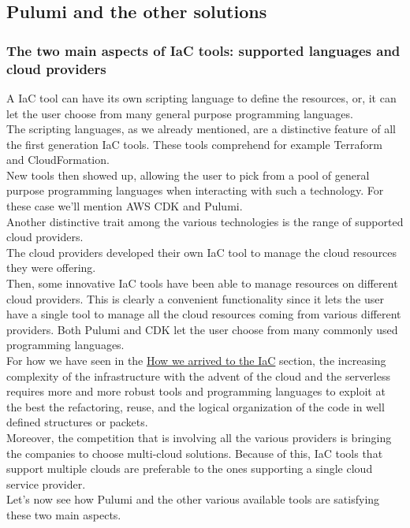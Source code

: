 \subsection{Pulumi and the other solutions}

\subsubsection{The two main aspects of IaC tools: supported languages and cloud providers}
A IaC tool can have its own scripting language to define the resources, or, it can let the user choose from many general purpose programming languages.\\
The scripting languages, as we already mentioned, are a distinctive feature of all the first generation IaC tools.
These tools comprehend for example Terraform and CloudFormation.\\
New tools then showed up, allowing the user to pick from a pool of general purpose programming languages when interacting with such a technology.
For these case we'll mention AWS CDK and Pulumi.\\

Another distinctive trait among the various technologies is the range of supported cloud providers.\\
The cloud providers developed their own IaC tool to manage the cloud resources they were offering.\\
Then, some innovative IaC tools have been able to manage resources on different cloud providers.
This is clearly a convenient functionality since it lets the user have a single tool to manage all the cloud resources coming from various different providers.
Both Pulumi and CDK let the user choose from many commonly used programming languages.\\

For how we have seen in the \hyperref[sec:story-iac]{How we arrived to the IaC} section, the increasing complexity of the infrastructure with the advent of the cloud and the serverless requires more and more robust tools and programming languages to exploit at the best the refactoring, reuse, and the logical organization of the code in well defined structures or packets.\\
Moreover, the competition that is involving all the various providers is bringing the companies to choose multi-cloud solutions. Because of this, IaC tools that support multiple clouds are preferable to the ones supporting a single cloud service provider.\\
Let's now see how Pulumi and the other various available tools are satisfying these two main aspects.

